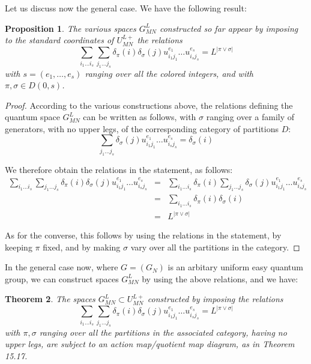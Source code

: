 \documentclass[12pt]{amsbook}
\newtheorem{theorem}{Theorem}[chapter]
\newtheorem{proposition}[theorem]{Proposition}
\begin{document}
Let us discuss now the general case. We have the following result:

\begin{proposition}
The various spaces $G_{MN}^L$ constructed so far appear by imposing to the standard coordinates of $U_{MN}^{L+}$ the relations
$$\sum_{i_1\ldots i_s}\sum_{j_1\ldots j_s}\delta_\pi(i)\delta_\sigma(j)u_{i_1j_1}^{e_1}\ldots u_{i_sj_s}^{e_s}=L^{|\pi\vee\sigma|}$$
with $s=(e_1,\ldots,e_s)$ ranging over all the colored integers, and with $\pi,\sigma\in D(0,s)$.
\end{proposition}

\begin{proof}
According to the various constructions above, the relations defining the quantum space $G_{MN}^L$ can be written as follows, with $\sigma$ ranging over a family of generators, with no upper legs, of the corresponding category of partitions $D$:
$$\sum_{j_1\ldots j_s}\delta_\sigma(j)u_{i_1j_1}^{e_1}\ldots u_{i_sj_s}^{e_s}=\delta_\sigma(i)$$

We therefore obtain the relations in the statement, as follows:
\begin{eqnarray*}
\sum_{i_1\ldots i_s}\sum_{j_1\ldots j_s}\delta_\pi(i)\delta_\sigma(j)u_{i_1j_1}^{e_1}\ldots u_{i_sj_s}^{e_s}
&=&\sum_{i_1\ldots i_s}\delta_\pi(i)\sum_{j_1\ldots j_s}\delta_\sigma(j)u_{i_1j_1}^{e_1}\ldots u_{i_sj_s}^{e_s}\\
&=&\sum_{i_1\ldots i_s}\delta_\pi(i)\delta_\sigma(i)\\
&=&L^{|\pi\vee\sigma|}
\end{eqnarray*}

As for the converse, this follows by using the relations in the statement, by keeping $\pi$ fixed, and by making $\sigma$ vary over all the partitions in the category.
\end{proof}

In the general case now, where $G=(G_N)$ is an arbitary uniform easy quantum group, we can construct spaces $G_{MN}^L$ by using the above relations, and we have:

\begin{theorem}
The spaces $G_{MN}^L\subset U_{MN}^{L+}$ constructed by imposing the relations 
$$\sum_{i_1\ldots i_s}\sum_{j_1\ldots j_s}\delta_\pi(i)\delta_\sigma(j)u_{i_1j_1}^{e_1}\ldots u_{i_sj_s}^{e_s}=L^{|\pi\vee\sigma|}$$
with $\pi,\sigma$ ranging over all the partitions in the associated category, having no upper legs, are subject to an action map/quotient map diagram, as in Theorem 15.17.
\end{theorem}
\end{document}
